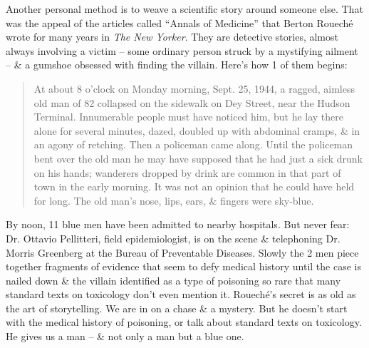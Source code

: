 \documentclass{article}
\begin{document}
Another personal method is to weave a scientific story around someone else. That was the appeal of the articles called ``Annals of Medicine'' that Berton Rouech\'e wrote for many years in \textit{The New Yorker}. They are detective stories, almost always involving a victim -- some ordinary person struck by a mystifying ailment -- \& a gumshoe obsessed with finding the villain. Here's how 1 of them begins:
\begin{quotation}
	At about 8 o'clock on Monday morning, Sept. 25, 1944, a ragged, aimless old man of 82 collapsed on the sidewalk on Dey Street, near the Hudson Terminal. Innumerable people must have noticed him, but he lay there alone for several minutes, dazed, doubled up with abdominal cramps, \& in an agony of retching. Then a policeman came along. Until the policeman bent over the old man he may have supposed that he had just a sick drunk on his hands; wanderers dropped by drink are common in that part of town in the early morning. It was not an opinion that he could have held for long. The old man's nose, lips, ears, \& fingers were sky-blue.
\end{quotation}
By noon, 11 blue men have been admitted to nearby hospitals. But never fear: Dr. Ottavio Pellitteri, field epidemiologist, is on the scene \& telephoning Dr. Morris Greenberg at the Bureau of Preventable Diseases. Slowly the 2 men piece together fragments of evidence that seem to defy medical history until the case is nailed down \& the villain identified as a type of poisoning so rare that many standard texts on toxicology don't even mention it. Rouech\'e's secret is as old as the art of storytelling. We are in on a chase \& a mystery. But he doesn't start with the medical history of poisoning, or talk about standard texts on toxicology. He gives us a man -- \& not only a man but a blue one.
\end{document}
